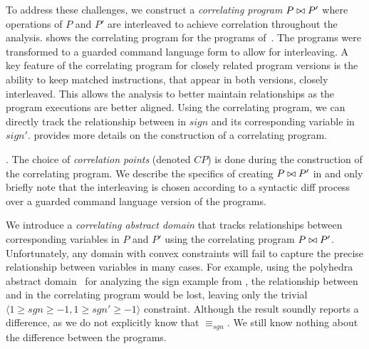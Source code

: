 To address these challenges, we construct a \emph{correlating program} $P \bowtie P'$ where operations of $P$ and $P'$ are interleaved to achieve correlation throughout the analysis.  shows the correlating program for the programs of~. The programs were transformed to a guarded command language form to allow for interleaving. A key feature of the correlating program for closely related program versions is the ability to keep matched instructions, that appear in both versions, closely interleaved. This allows the analysis to better maintain relationships as the program executions are better aligned. Using the correlating program, we can directly track the relationship between  in $sign$ and its corresponding variable  in $sign'$.  provides more details on the construction of a correlating program.


.
The choice of \emph{correlation points} (denoted $CP$) is done during the construction of the correlating program. We describe the specifics of creating $P \bowtie P'$ in  and only briefly note that the interleaving is chosen according to a syntactic diff process over a guarded command language version of the programs.

We introduce a \emph{correlating abstract domain} that tracks relationships between corresponding variables in $P$ and $P'$ using the correlating program $P \bowtie P'$. Unfortunately, any domain with convex constraints will fail to capture the precise relationship between variables in many cases. For example, using the polyhedra abstract domain~\cite{CousotHalbwachs78} for analyzing the sign example from , the relationship between  and  in the correlating program would be lost, leaving only the trivial $\langle 1 \geq sgn \geq -1, 1 \geq sgn' \geq -1 \rangle$ constraint. Although the result soundly reports a difference, as we do not explicitly know that $\equiv_{sgn}$. We still know nothing about the difference between the programs.

